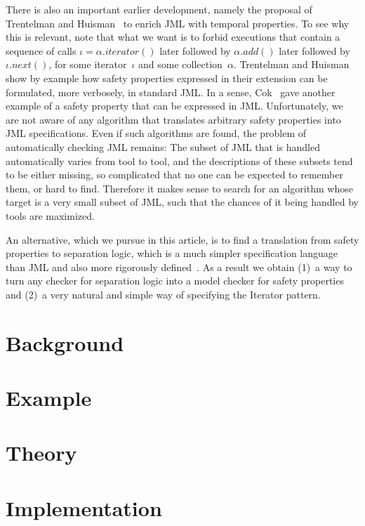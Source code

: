 \documentclass[a4paper]{article}
\theoremstyle{slanted}
\theoremstyle{definition}
\theoremstyle{remark}
\begin{document}
There is also an important earlier development, namely the proposal of Trentelman and Huisman~\cite{trentelman2002} to enrich JML with temporal properties.
To see why this is relevant, note that what we want is to forbid executions that contain a sequence of calls $\iota=\alpha.\mathit{iterator}()$ later followed by $\alpha.\mathit{add}()$ later followed by $\iota.\mathit{next}()$, for some iterator~$\iota$ and some collection~$\alpha$.
Trentelman and Huisman show by example how safety properties expressed in their extension can be formulated, more verbosely, in standard JML\null.
In a sense, Cok~\cite{cok2006} gave another example of a safety property that can be expressed in JML\null.
Unfortunately, we are not aware of any algorithm that translates arbitrary safety properties into JML specifications.
Even if such algorithms are found, the problem of automatically checking JML remains:
The subset of JML that is handled automatically varies from tool to tool, and the descriptions of these subsets tend to be either missing, so complicated that no one can be expected to remember them, or hard to find.
Therefore it makes sense to search for an algorithm whose target is a very small subset of JML, such that the chances of it being handled by tools are maximized.

An alternative, which we pursue in this article, is to find a translation from safety properties to separation logic, which is a much simpler specification language than JML and also more rigorously defined~\cite{todo}. 
As a result we obtain (1)~a way to turn any checker for separation logic into a model checker for safety properties and (2)~a very natural and simple way of specifying the Iterator pattern.

\section{Background}

\section{Example}

\section{Theory}

\section{Implementation}



\end{document}
